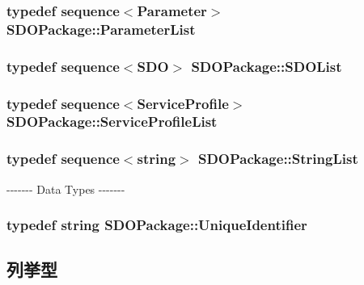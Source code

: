 \subsubsection[{ParameterList}]{\setlength{\rightskip}{0pt plus 5cm}typedef sequence$<${\bf Parameter}$>$ {\bf SDOPackage::ParameterList}}\label{namespaceSDOPackage_ac7ed6ef96e20edd9db20df029d1d46d2}
\subsubsection[{SDOList}]{\setlength{\rightskip}{0pt plus 5cm}typedef sequence$<${\bf SDO}$>$ {\bf SDOPackage::SDOList}}\label{namespaceSDOPackage_ab3569f8f3e2127ff298ae3c526cf3921}
\subsubsection[{ServiceProfileList}]{\setlength{\rightskip}{0pt plus 5cm}typedef sequence$<${\bf ServiceProfile}$>$ {\bf SDOPackage::ServiceProfileList}}\label{namespaceSDOPackage_ab56433e04a6155a19aeae801c45155e8}
\subsubsection[{StringList}]{\setlength{\rightskip}{0pt plus 5cm}typedef sequence$<$string$>$ {\bf SDOPackage::StringList}}\label{namespaceSDOPackage_a808e705041501570a7ef8870afe0d1a8}
-\/-\/-\/-\/-\/-\/-\/ Data Types -\/-\/-\/-\/-\/-\/-\/ 
\subsubsection[{UniqueIdentifier}]{\setlength{\rightskip}{0pt plus 5cm}typedef string {\bf SDOPackage::UniqueIdentifier}}\label{namespaceSDOPackage_a05a058395bb070fc59e9d81d4b1f9f98}


\subsection{列挙型}
